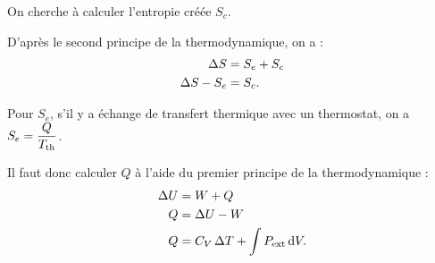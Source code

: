 On cherche à calculer l'entropie créée \(S_c\).

D'après le second principe de la thermodynamique, on a : \[\begin{aligned}
\adif{S}&=S_e+S_c \\
\adif{S}-S_e&=S_c.
\end{aligned}\]

Pour \(S_e\), s'il y a échange de transfert thermique avec un thermostat, on a \(S_e=\dfrac{Q}{T_{\mathrm{th}}}\).

Il faut donc calculer \(Q\) à l'aide du premier principe de la thermodynamique : \[\begin{aligned}
\adif{U}&=W+Q \\
Q&=\adif{U}-W \\
Q&=C_V\adif{T}+\int P_\ext\odif{V}.
\end{aligned}\]